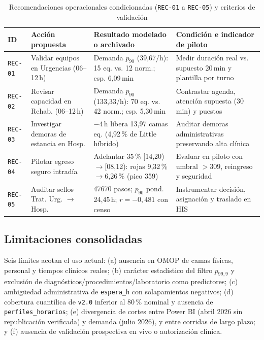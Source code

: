 \begin{table}[t]
\caption{Recomendaciones operacionales condicionadas (\texttt{REC-01} a \texttt{REC-05}) y criterios de validación}
\label{tab:recomendaciones}
\centering
\footnotesize
\begin{tabularx}{\textwidth}{@{}l L{0.23\textwidth} L{0.31\textwidth} Y@{}}
\toprule
ID & Acción propuesta & Resultado modelado o archivado & Condición e indicador de piloto \\
\midrule
\texttt{REC-01} & Validar equipos en Urgencias (06--12\,h) & Demanda $p_{90}$ (39,67/h): 15 eq. vs. 12 norm.; esp. 6,09\,min & Medir duración real vs. supuesto 20\,min y plantilla por turno \\
\texttt{REC-02} & Revisar capacidad en Rehab. (06--12\,h) & Demanda $p_{90}$ (133,33/h): 70 eq. vs. 42 norm.; esp. 5,30\,min & Contrastar agenda, atención supuesta (30\,min) y puestos \\
\texttt{REC-03} & Investigar demoras de estancia en Hosp. & $-4$\,h libera 13,97 camas eq. (4,92\,\% de Little híbrido) & Auditar demoras administrativas preservando alta clínica \\
\texttt{REC-04} & Pilotar egreso seguro intradía & Adelantar 35\,\% [14,20)$\rightarrow$[08,12): rojas 9,32\,\%$\rightarrow$6,26\,\% (pico 359) & Evaluar en piloto con umbral $>309$, reingreso y seguridad \\
\texttt{REC-05} & Auditar sellos Trat. Urg. $\rightarrow$ Hosp. & \num{47670} pasos; $p_{90}$ pond. 24,45\,h; $r = -0{,}481$ con censo & Instrumentar decisión, asignación y traslado en HIS \\
\bottomrule
\end{tabularx}
\end{table}

\subsection{Limitaciones consolidadas}

Seis límites acotan el uso actual: (a) ausencia en OMOP de camas físicas, personal y tiempos clínicos reales; (b) carácter estadístico del filtro $p_{99{,}9}$ y exclusión de diagnósticos/procedimientos/laboratorio como predictores; (c) ambigüedad administrativa de \texttt{espera\_h} con solapamientos negativos; (d) cobertura cuantílica de \texttt{v2.0} inferior al 80\,\% nominal y ausencia de \texttt{perfiles\_horarios}; (e) divergencia de cortes entre Power BI (abril 2026 sin republicación verificada) y demanda (julio 2026), y entre corridas de largo plazo; y (f) ausencia de validación prospectiva en vivo o autorización clínica.
